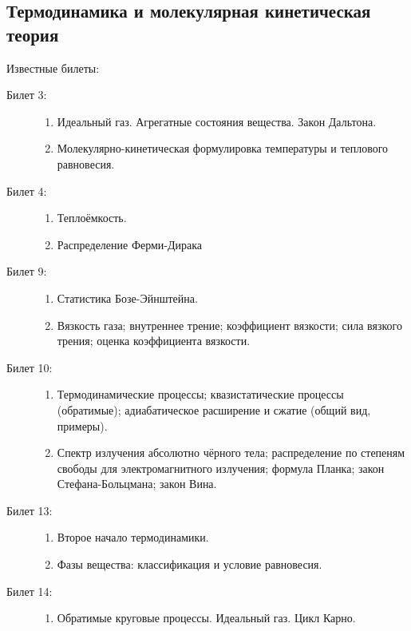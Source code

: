 \documentclass{article}
\begin{document}
\subsection*{Термодинамика и молекулярная кинетическая теория}
Известные билеты:
\begin{description}
	\item[Билет 3:]\phantom{}
	\begin{enumerate}
		\item Идеальный газ. Агрегатные состояния вещества.
		      Закон Дальтона.
		\item Молекулярно-кинетическая формулировка температуры
		      и теплового равновесия.
	\end{enumerate}
	\item[Билет 4:]\phantom{}
	\begin{enumerate}
		\item Теплоёмкость.
		\item Распределение Ферми-Дирака
	\end{enumerate}
	\item[Билет 9:]\phantom{}
	\begin{enumerate}
		\item Статистика Бозе-Эйнштейна.
		\item Вязкость газа; внутреннее трение; коэффициент вязкости;
		      сила вязкого трения; оценка коэффициента вязкости.
	\end{enumerate}
	\item[Билет 10:]\phantom{}
	\begin{enumerate}
		\item Термодинамические процессы; квазистатические процессы
		      (обратимые); адиабатическое расширение и сжатие
		      (общий вид, примеры).
		\item Спектр излучения абсолютно чёрного тела; распределение
		      по степеням свободы для электромагнитного излучения;
		      формула Планка; закон Стефана-Больцмана; закон Вина.
	\end{enumerate}
	\item[Билет 13:]\phantom{}
	\begin{enumerate}
		\item Второе начало термодинамики.
		\item Фазы вещества: классификация и условие равновесия.
	\end{enumerate}
	\item[Билет 14:]\phantom{}
	\begin{enumerate}
		\item Обратимые круговые процессы. Идеальный газ. Цикл Карно.

\end{enumerate}
\end{description}
\end{document}
